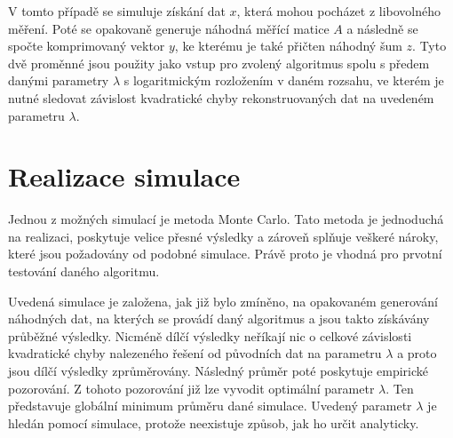 \documentclass[FM,BP]{tulthesis}
\begin{document}
V tomto případě se simuluje získání dat $x$, která mohou pocházet z libovolného měření. Poté se opakovaně generuje náhodná měřící matice $A$ a následně se spočte komprimovaný vektor $y$, ke kterému je také přičten náhodný šum $z$. Tyto dvě proměnné jsou použity jako vstup pro zvolený algoritmus spolu s předem danými parametry $\lambda$ s logaritmickým rozložením v daném rozsahu, ve kterém je nutné sledovat závislost kvadratické chyby rekonstruovaných dat na uvedeném parametru $\lambda$.

\section{Realizace simulace}
\label{subch:sim}
Jednou z možných simulací je metoda Monte Carlo. Tato metoda je jednoduchá na realizaci, poskytuje velice přesné výsledky a zároveň splňuje veškeré nároky, které jsou požadovány od podobné simulace. Právě proto je vhodná pro prvotní testování daného algoritmu. 

Uvedená simulace je založena, jak již bylo zmíněno, na opakovaném generování náhodných dat, na kterých se provádí daný algoritmus a jsou takto získávány průběžné výsledky. Nicméně dílčí výsledky neříkají nic o celkové závislosti kvadratické chyby nalezeného řešení od původních dat na parametru $\lambda$ a proto jsou dílčí výsledky zprůměrovány. Následný průměr poté poskytuje empirické pozorování. Z tohoto pozorování již lze vyvodit optimální parametr $\lambda$. Ten představuje globální minimum průměru dané simulace. Uvedený parametr $\lambda$ je hledán pomocí simulace, protože neexistuje způsob, jak ho určit analyticky.
\end{document}
